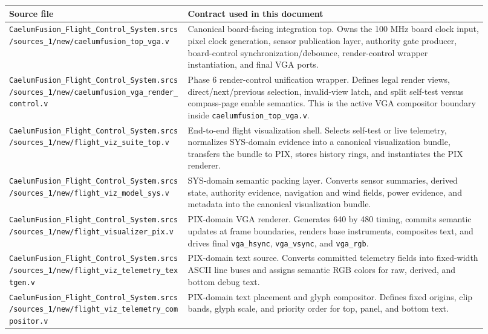 \documentclass{article}
\newcommand{\sig}[1]{\begingroup\nolinkurl{#1}\endgroup}
\newcommand{\file}[1]{\begingroup\nolinkurl{#1}\endgroup}
\begin{document}
\begin{longtable}{p{0.34\linewidth} p{0.58\linewidth}}
\toprule
\textbf{Source file} & \textbf{Contract used in this document} \\
\midrule
\endhead
\file{CaelumFusion_Flight_Control_System.srcs/sources_1/new/caelumfusion_top_vga.v} &
Canonical board-facing integration top.  Owns the 100 MHz board clock input,
pixel clock generation, sensor publication layer, authority gate producer,
board-control synchronization/debounce, render-control wrapper instantiation,
and final VGA ports. \\

\file{CaelumFusion_Flight_Control_System.srcs/sources_1/new/caelumfusion_vga_render_control.v} &
Phase 6 render-control unification wrapper.  Defines legal render views,
direct/next/previous selection, invalid-view latch, and split self-test versus
compass-page enable semantics.  This is the active VGA compositor boundary
inside \file{caelumfusion_top_vga.v}. \\

\file{CaelumFusion_Flight_Control_System.srcs/sources_1/new/flight_viz_suite_top.v} &
End-to-end flight visualization shell.  Selects self-test or live telemetry,
normalizes SYS-domain evidence into a canonical visualization bundle, transfers
the bundle to PIX, stores history rings, and instantiates the PIX renderer. \\

\file{CaelumFusion_Flight_Control_System.srcs/sources_1/new/flight_viz_model_sys.v} &
SYS-domain semantic packing layer.  Converts sensor summaries, derived state,
authority evidence, navigation and wind fields, power evidence, and metadata
into the canonical visualization bundle. \\

\file{CaelumFusion_Flight_Control_System.srcs/sources_1/new/flight_visualizer_pix.v} &
PIX-domain VGA renderer.  Generates 640 by 480 timing, commits semantic updates
at frame boundaries, renders base instruments, composites text, and drives final
\sig{vga_hsync}, \sig{vga_vsync}, and \sig{vga_rgb}. \\

\file{CaelumFusion_Flight_Control_System.srcs/sources_1/new/flight_viz_telemetry_textgen.v} &
PIX-domain text source.  Converts committed telemetry fields into fixed-width
ASCII line buses and assigns semantic RGB colors for raw, derived, and bottom
debug text. \\

\file{CaelumFusion_Flight_Control_System.srcs/sources_1/new/flight_viz_telemetry_compositor.v} &
PIX-domain text placement and glyph compositor.  Defines fixed origins, clip
bands, glyph scale, and priority order for top, panel, and bottom text. \\


\end{longtable}
\end{document}
